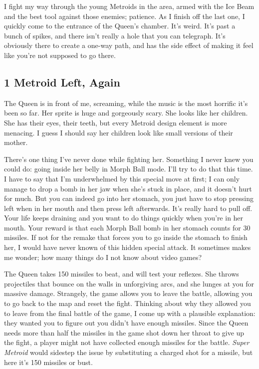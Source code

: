 \documentclass{book}
\begin{document}
I fight my way through the young Metroids in the area, armed with the Ice Beam and the best tool against those enemies; patience. As I finish off the last one, I quickly come to the entrance of the Queen’s chamber. It’s weird. It’s past a bunch of spikes, and there isn’t really a hole that you can telegraph. It’s obviously there to create a one-way path, and has the side effect of making it feel like you’re not supposed to go there.\par
\FloatBarrier\subsection*{1 Metroid Left, Again}
The Queen is in front of me, screaming, while the music is the most horrific it’s been so far. Her sprite is huge and gorgeously scary. She looks like her children. She has their eyes, their teeth, but every Metroid design element is more menacing. I guess I should say her children look like small versions of their mother.\par
There’s one thing I’ve never done while fighting her. Something I never knew you could do: going inside her belly in Morph Ball mode. I’ll try to do that this time. I have to say that I’m underwhelmed by this special move at first; I can only manage to drop a bomb in her jaw when she’s stuck in place, and it doesn’t hurt for much. But you can indeed go into her stomach, you just have to stop pressing left when in her mouth and then press left afterwards. It’s really hard to pull off. Your life keeps draining and you want to do things quickly when you’re in her mouth. Your reward is that each Morph Ball bomb in her stomach counts for 30 missiles. If not for the remake that forces you to go inside the stomach to finish her, I would have never known of this hidden special attack. It sometimes makes me wonder; how many things do I not know about video games?\par
The Queen takes 150 missiles to beat, and will test your reflexes. She throws projectiles that bounce on the walls in unforgiving arcs, and she lunges at you for massive damage. Strangely, the game allows you to leave the battle, allowing you to go back to the map and reset the fight. Thinking about why they allowed you to leave from the final battle of the game, I come up with a plausible explanation: they wanted you to figure out you didn’t have enough missiles. Since the Queen needs more than half the missiles in the game shot down her throat to give up the fight, a player might not have collected enough missiles for the battle. \emph{Super Metroid} would sidestep the issue by substituting a charged shot for a missile, but here it’s 150 missiles or bust.\par
\end{document}
